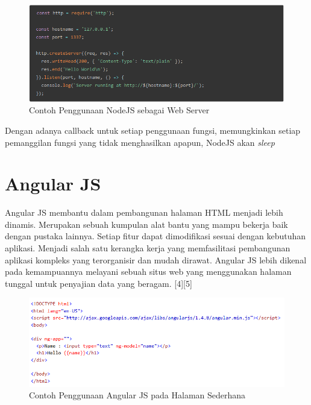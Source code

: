 \documentclass{ta-its}
\begin{document}
			\begin{figure}[h] %
				\centering
				\includegraphics[width=\linewidth]{contoh_img/contoh_nodejs}
				\caption{Contoh Penggunaan NodeJS sebagai Web Server}
				\label{contohNodeJS}
			\end{figure}
			
			
			Dengan adanya callback untuk setiap penggunaan fungsi, memungkinkan setiap pemanggilan fungsi yang tidak menghasilkan apapun, NodeJS akan \textit{sleep}

        \section{Angular JS}
			Angular JS membantu dalam pembangunan halaman HTML menjadi lebih dinamis. Merupakan sebuah kumpulan alat bantu yang mampu bekerja baik dengan pustaka lainnya. Setiap fitur dapat dimodifikasi sesuai dengan kebutuhan aplikasi. Menjadi salah satu kerangka kerja yang memfasilitasi pembangunan aplikasi kompleks yang terorganisir dan mudah dirawat. Angular JS lebih dikenal pada kemampuannya melayani sebuah situs web yang menggunakan halaman tunggal untuk penyajian data yang beragam. [4][5]
			
			\begin{figure}[h] %
				\centering
				\includegraphics[width=\linewidth]{contoh_img/contoh_angular}
				\caption{Contoh Penggunaan Angular JS pada Halaman Sederhana}
				\label{contohAngularJS}
			\end{figure}
\end{document}
